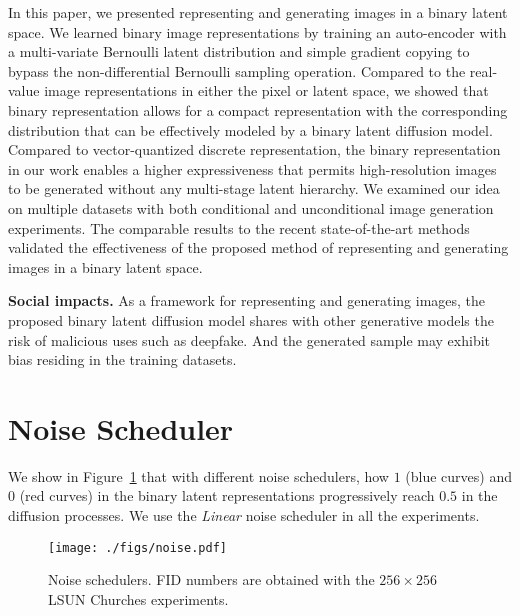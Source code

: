 \documentclass[10pt,twocolumn,letterpaper]{article}
\begin{document}
In this paper, we presented representing and generating images in a binary latent space. 
We learned binary image representations by training an auto-encoder with a multi-variate Bernoulli latent distribution and simple gradient copying to bypass the non-differential Bernoulli sampling operation. 
Compared to the real-value image representations in either the pixel or latent space, we showed that binary representation allows for a compact representation with the corresponding distribution that can be effectively modeled by a binary latent diffusion model. 
Compared to vector-quantized discrete representation, the binary representation in our work enables a higher expressiveness that permits high-resolution images to be generated without any multi-stage latent hierarchy. 
We examined our idea on multiple datasets with both conditional and unconditional image generation experiments. The comparable results to the recent state-of-the-art methods validated the effectiveness of the proposed method of representing and generating images in a binary latent space. 

\noindent \textbf{Social impacts.} As a framework for representing and generating images, the proposed binary latent diffusion model shares with other generative models the risk of malicious uses such as deepfake. And the generated sample may exhibit bias residing in the training datasets. 

{\small


}

\clearpage
\appendix
\onecolumn 

\newcount\cvprrulercount
\setcounter{page}{1}

\setcounter{table}{0}
\setcounter{equation}{0}
\setcounter{figure}{0}

\renewcommand{\thetable}{\Alph{table}}
\renewcommand{\thefigure}{\Alph{figure}}

\section{Noise Scheduler}
\label{noise}

We show in Figure~\ref{fig:noise} that with different noise schedulers, how $1$ (blue curves) and $0$ (red curves) in the binary latent representations progressively reach $0.5$ in the diffusion processes. We use the \textit{Linear} noise scheduler in all the experiments. 

\begin{figure}[h]
    \centering
    \texttt{[image: ./figs/noise.pdf]}
    \caption{Noise schedulers. FID numbers are obtained with the $256\times 256$ LSUN Churches experiments. }
\label{fig:noise}
\end{figure}
\end{document}
